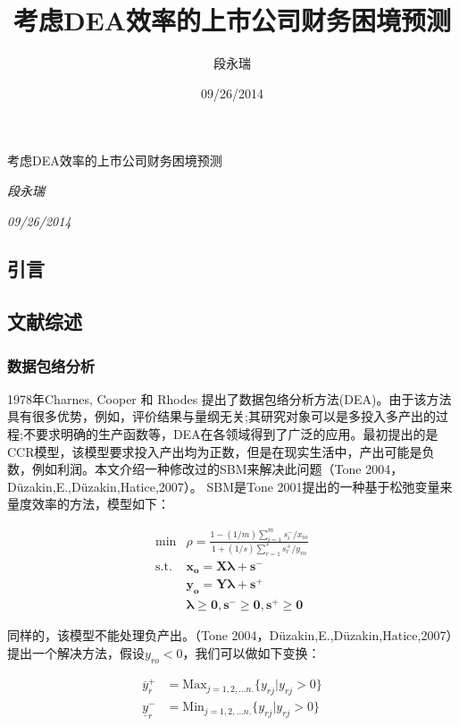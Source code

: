\documentclass[]{article}
\title{考虑DEA效率的上市公司财务困境预测}
\author{段永瑞}
\date{09/26/2014}
\begin{document}
\begin{center}
\huge 考虑DEA效率的上市公司财务困境预测 \\[0.2cm]
\end{center}
\begin{center}
\large \emph{段永瑞}\\[0.1cm]
\end{center}
\begin{center}
\large \emph{09/26/2014} \\
\end{center}
\normalsize


\subsection{引言}

\subsection{文献综述}

\subsubsection{数据包络分析}

1978年Charnes, Cooper 和 Rhodes
提出了数据包络分析方法(DEA)。由于该方法具有很多优势，例如，评价结果与量纲无关;其研究对象可以是多投入多产出的过程;不要求明确的生产函数等，DEA在各领域得到了广泛的应用。最初提出的是CCR模型，该模型要求投入产出均为正数，但是在现实生活中，产出可能是负数，例如利润。本文介绍一种修改过的SBM来解决此问题（Tone
2004，Düzakin,E.,Düzakin,Hatice,2007）。 SBM是Tone
2001提出的一种基于松弛变量来量度效率的方法，模型如下：

\[
    \begin{aligned}
    \min & \rho=\frac{1-(1/m)\sum_{i=1}^{m}s_{i}^{-}/x_{io}}{1+(1/s)\sum_{r=1}^{s}s_{r}^{+}/y_{ro}}\\
    \textrm{s.t.} & \mathbf{x_{o}}=\mathbf{X\lambda}+\mathbf{s^{-}}\\
     & \mathbf{y_{o}}=\mathbf{Y\lambda}+\mathbf{s^{+}}\\
     & \mathbf{\lambda}\geq\mathbf{0},\mathbf{s^{-}}\geq\mathbf{0},\mathbf{s^{+}}\geq\mathbf{0}
    \end{aligned}
\]

同样的，该模型不能处理负产出。（Tone
2004，Düzakin,E.,Düzakin,Hatice,2007）提出一个解决方法，假设$y_{ro}<0$，我们可以做如下变换：

\[
\begin{aligned}
\overline{y}_{r}^{+} & =\textrm{Max}_{j=1,2,...n.}\{y_{rj}|y_{rj}>0\}\\
\underline{y}_{r}^{-} & =\textrm{Min}_{j=1,2,...n.}\{y_{rj}|y_{rj}>0\}
\end{aligned}
\]
\end{document}

